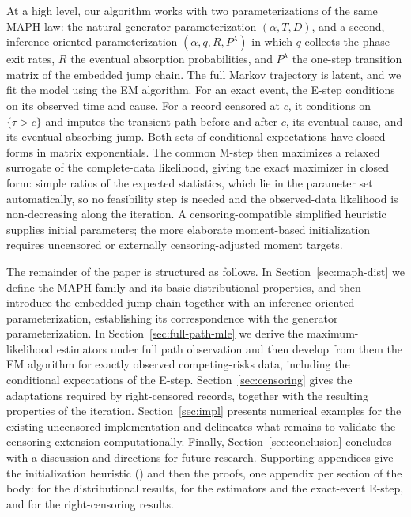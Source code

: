 \documentclass{article}
\newenvironment{rcrevision}{}{}
\newcommand{\aachg}[1]{#1}
\newcommand{\subchg}[1]{#1}
\begin{document}
\begin{rcrevision}
At a high level, our algorithm works with two parameterizations of the same MAPH law: the natural generator parameterization $(\alpha,T,D)$, and a second, inference-oriented parameterization \subchg{$(\alpha,q,R,P^\lambda)$ in which $q$ collects the phase exit rates, $R$ the eventual absorption probabilities, and $P^\lambda$ the one-step transition matrix of the embedded jump chain}. The full Markov trajectory is latent, and we fit the model \aachg{using the EM algorithm}. For an exact event, the E-step conditions on its observed time and cause. For a record censored at $c$, it conditions on $\{\tau>c\}$ and imputes the transient path before and after $c$, its eventual cause, and its eventual absorbing jump. Both sets of conditional expectations have closed forms in matrix exponentials. The common M-step then maximizes a relaxed surrogate of the complete-data likelihood, \subchg{giving the exact maximizer in closed form: simple ratios of the expected statistics, which lie in the parameter set automatically, so no feasibility step is needed and the observed-data likelihood is non-decreasing along the iteration.} A censoring-compatible simplified heuristic supplies initial parameters; the more elaborate moment-based initialization requires uncensored or externally censoring-adjusted moment targets.
\end{rcrevision}


\begin{rcrevision}
The remainder of the paper is structured as follows. In Section~\ref{sec:maph-dist} we define the MAPH family and its basic distributional properties, and then introduce the embedded jump chain together with an inference-oriented parameterization, establishing its correspondence with the generator parameterization. In Section~\ref{sec:full-path-mle} we derive the maximum-likelihood estimators under full path observation and then develop from them the EM algorithm for exactly observed competing-risks data, including the conditional expectations of the E-step. Section~\ref{sec:censoring} gives the adaptations required by right-censored records, together with the resulting properties of the iteration. Section~\ref{sec:impl} presents numerical examples for the existing uncensored implementation and delineates what remains to validate the censoring extension computationally. \aachg{Finally, Section~\ref{sec:conclusion} concludes with a discussion and directions for future research.} Supporting appendices give the initialization heuristic () and then the proofs, one appendix per section of the body:  for the distributional results,  for the estimators and the exact-event E-step, and  for the right-censoring results.
\end{rcrevision}
\end{document}
